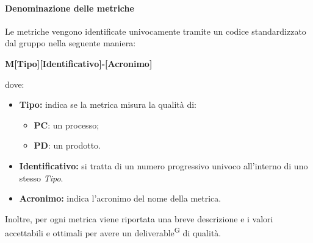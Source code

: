 \paragraph{Denominazione delle metriche}
Le metriche vengono identificate univocamente tramite un codice standardizzato dal gruppo nella seguente maniera:
\begin{center}
    \textbf{M[Tipo][Identificativo]-[Acronimo]}
\end{center}
dove:
\begin{itemize}
    \item \textbf{Tipo:} indica se la metrica misura la qualità di:
        \begin{itemize}
            \item \textbf{PC}: un processo;
            \item \textbf{PD}: un prodotto.
        \end{itemize}                 
    \item \textbf{Identificativo:} si tratta di un numero progressivo univoco all'interno di uno stesso \textit{Tipo}.
    \item \textbf{Acronimo:} indica l'acronimo del nome della metrica.
\end{itemize}
Inoltre, per ogni metrica viene riportata una breve descrizione e i valori accettabili e ottimali per avere un deliverable\textsuperscript{G} di qualità.

